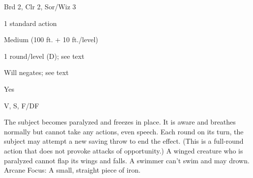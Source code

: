 
\begin{description*}
\item[Level:] Brd 2, Clr 2, Sor/Wiz 3
\item[Casting Time:] 1 standard action
\item[Range:] Medium (100 ft. + 10 ft./level)
\item[Duration:] 1 round/level (D); see text
\item[Saving Throw:] Will negates; see text
\item[Spell Resistance:] Yes
\item[Components:] V, S, F/DF
\end{description*}

The subject becomes paralyzed and freezes in place. It is aware and breathes normally
but cannot take any actions, even speech. Each round on its turn, the subject may
attempt a new saving throw to end the effect. (This is a full-round action that
does not provoke attacks of opportunity.)
A winged creature who is paralyzed cannot flap its wings and falls. A swimmer can't
swim and may drown.
Arcane Focus: A small, straight piece of iron.